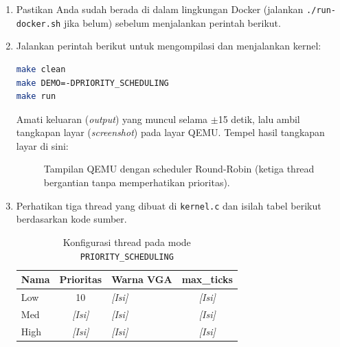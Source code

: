 \begin{enumerate}

	\item Pastikan Anda sudah berada di dalam lingkungan Docker (jalankan \texttt{./run-docker.sh} jika belum) sebelum menjalankan perintah berikut.

	\item Jalankan perintah berikut untuk mengompilasi dan menjalankan kernel:
	      \begin{lstlisting}[language=bash, caption={Compile dan jalankan demo Priority Scheduling}]
make clean
make DEMO=-DPRIORITY_SCHEDULING
make run
    \end{lstlisting}

	      Amati keluaran (\textit{output}) yang muncul selama $\pm$15 detik, lalu ambil tangkapan layar (\textit{screenshot}) pada layar QEMU. Tempel hasil tangkapan layar di sini:

	      \begin{figure}[H]
		      \centering
		      \caption{Tampilan QEMU dengan scheduler Round-Robin (ketiga thread bergantian tanpa memperhatikan prioritas).}
	      \end{figure}

	\item Perhatikan tiga thread yang dibuat di \texttt{kernel.c} dan isilah tabel berikut berdasarkan kode sumber.

	      \begin{table}[htbp]
		      \centering
		      \caption{Konfigurasi thread pada mode \texttt{PRIORITY\_SCHEDULING}}
		      \begin{tabulary}{\textwidth}{|l|c|l|c|}
			      \hline
			      \textbf{Nama} & \textbf{Prioritas} & \textbf{Warna VGA} & \textbf{max\_ticks} \\ \hline
			      Low  & 10 & \textit{[Isi]} & \textit{[Isi]} \\ \hline
			      Med  & \textit{[Isi]} & \textit{[Isi]} & \textit{[Isi]} \\ \hline
			      High & \textit{[Isi]} & \textit{[Isi]} & \textit{[Isi]} \\ \hline
		      \end{tabulary}
	      \end{table}

\end{enumerate}

